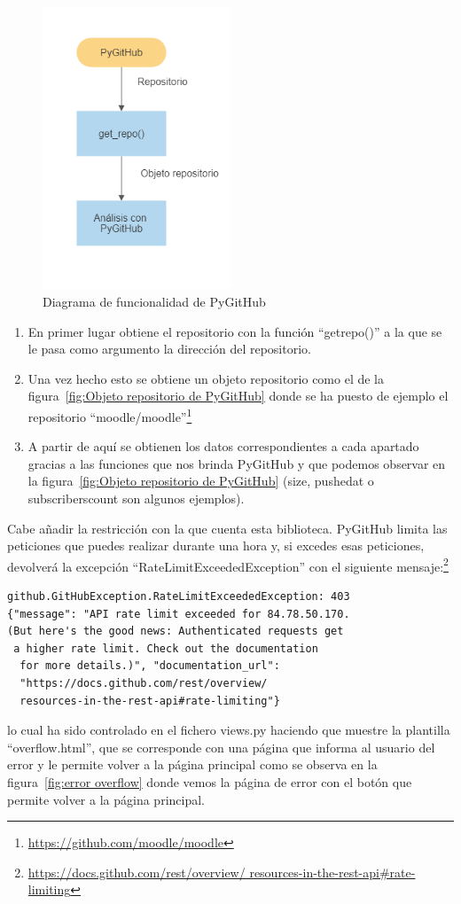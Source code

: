 \documentclass[a4paper, 12pt]{book}
\begin{document}
\begin{figure}
    \centering
    \includegraphics[width=0.5\textwidth, keepaspectratio]{img/diagrama_pygithub.png}
    \caption{Diagrama de funcionalidad de PyGitHub}\label{fig:diagrama pygithub}
\end{figure}
\begin{enumerate}
	\item En primer lugar obtiene el repositorio con la función ``get\textunderscore repo()'' a la que se le pasa como argumento la dirección del repositorio.
	\item Una vez hecho esto se obtiene un objeto repositorio como el de la figura~\ref{fig:Objeto repositorio de PyGitHub} donde se ha puesto de ejemplo el repositorio ``moodle/moodle''\footnote{\url{https://github.com/moodle/moodle}}
	\item A partir de aquí se obtienen los datos correspondientes a cada apartado gracias a las funciones que nos brinda PyGitHub y que podemos observar en la figura~\ref{fig:Objeto repositorio de PyGitHub} (size, pushed\textunderscore at o subscribers\textunderscore count son algunos ejemplos). 
\end{enumerate}
Cabe añadir la restricción con la que cuenta esta biblioteca. PyGitHub limita las peticiones que puedes realizar durante una hora y, si excedes esas peticiones, devolverá la excepción ``RateLimitExceededException'' con el siguiente mensaje:\footnote{\url{https://docs.github.com/rest/overview/
  resources-in-the-rest-api#rate-limiting}} \begin{verbatim}
github.GitHubException.RateLimitExceededException: 403 
{"message": "API rate limit exceeded for 84.78.50.170. 
(But here's the good news: Authenticated requests get
 a higher rate limit. Check out the documentation
  for more details.)", "documentation_url": 
  "https://docs.github.com/rest/overview/
  resources-in-the-rest-api#rate-limiting"} 
\end{verbatim} lo cual ha sido controlado en el fichero views.py haciendo que muestre la plantilla ``overflow.html'', que se corresponde con una página que informa al usuario del error y le permite volver a la página principal como se observa en la figura~\ref{fig:error overflow} donde vemos la página de error con el botón que permite volver a la página principal.
\end{document}
